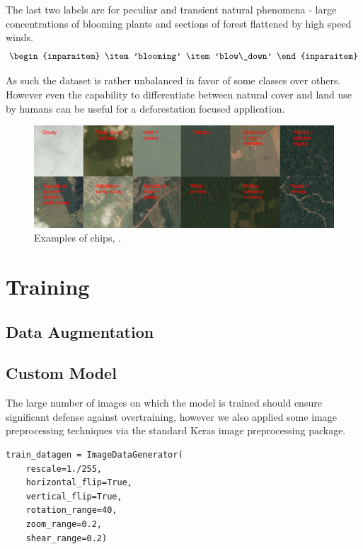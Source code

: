 \documentclass[
	a4paper, %
	10pt, %
	unnumberedsections, %
	twoside, %
]{LTJournalArticle}
\begin{document}
The last two labels are for peculiar and transient natural phenomena - large concentrations of blooming plants and sections of forest flattened by high speed winds.
\[\begin{inparaitem}
	\item 'blooming'
	\item 'blow\_down'
\end{inparaitem}\]

As such the dataset is rather unbalanced in favor of some classes over others. However even the capability to differentiate between natural cover and land use by humans can be useful for a deforestation focused application.

\begin{figure} 
	\includegraphics[width=\linewidth]{Figures/chips.jpg}
	\caption{Examples of chips, \href{https://storage.googleapis.com/kaggle-competitions/kaggle/6322/media/chips.jpg}{}.}
	\label{fig:tcanther}
\end{figure}

\section{Training}

\subsection{Data Augmentation}

\subsection{Custom Model}

The large number of images on which the model is trained should ensure significant defense against overtraining, however we also applied some image preprocessing techniques via the standard Keras image preprocessing package.

\begin{verbatim}
train_datagen = ImageDataGenerator(
    rescale=1./255,
    horizontal_flip=True,
    vertical_flip=True,
    rotation_range=40,
    zoom_range=0.2,
    shear_range=0.2)
\end{verbatim}
\end{document}
